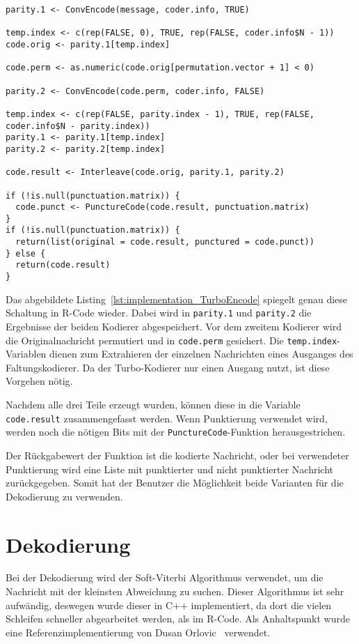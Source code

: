 \begin{lstlisting}[caption=Implementierung von \texttt{TurboEncode}, label={lst:implementation_TurboEncode}, float=!th]
parity.1 <- ConvEncode(message, coder.info, TRUE)

temp.index <- c(rep(FALSE, 0), TRUE, rep(FALSE, coder.info$N - 1))
code.orig <- parity.1[temp.index]

code.perm <- as.numeric(code.orig[permutation.vector + 1] < 0)

parity.2 <- ConvEncode(code.perm, coder.info, FALSE)

temp.index <- c(rep(FALSE, parity.index - 1), TRUE, rep(FALSE, coder.info$N - parity.index))
parity.1 <- parity.1[temp.index]
parity.2 <- parity.2[temp.index]

code.result <- Interleave(code.orig, parity.1, parity.2)

if (!is.null(punctuation.matrix)) {
  code.punct <- PunctureCode(code.result, punctuation.matrix)
}
if (!is.null(punctuation.matrix)) {
  return(list(original = code.result, punctured = code.punct))
} else {
  return(code.result)
}
\end{lstlisting}

Das abgebildete Listing~\ref{lst:implementation_TurboEncode} spiegelt genau diese Schaltung in R-Code wieder. Dabei wird in \texttt{parity.1} und \texttt{parity.2} die Ergebnisse der beiden Kodierer abgespeichert. Vor dem zweitem Kodierer wird die Originalnachricht permutiert und in \texttt{code.perm} gesichert. Die \texttt{temp.index}-Variablen dienen zum Extrahieren der einzelnen Nachrichten eines Ausganges des Faltungskodierer. Da der Turbo-Kodierer nur einen Ausgang nutzt, ist diese Vorgehen nötig.

Nachdem alle drei Teile erzeugt wurden, können diese in die Variable \texttt{code.result} zusammengefasst werden. Wenn Punktierung verwendet wird, werden noch die nötigen Bits mit der \texttt{PunctureCode}-Funktion herausgestrichen. 

Der Rückgabewert der Funktion ist die kodierte Nachricht, oder bei verwendeter Punktierung wird eine Liste mit punktierter und nicht punktierter Nachricht zurückgegeben. Somit hat der Benutzer die Möglichkeit beide Varianten für die Dekodierung zu verwenden.  

\FloatBarrier
\section{Dekodierung}
\label{sec:implementation_decode}
Bei der Dekodierung wird der Soft-Viterbi Algorithmus verwendet, um die Nachricht mit der kleinsten Abweichung zu suchen. Dieser Algorithmus ist sehr aufwändig, deswegen wurde dieser in C++ implementiert, da dort die vielen Schleifen schneller abgearbeitet werden, als im R-Code. Als Anhaltspunkt wurde eine Referenzimplementierung von Dusan Orlovic~\cite{SOVA} verwendet.


